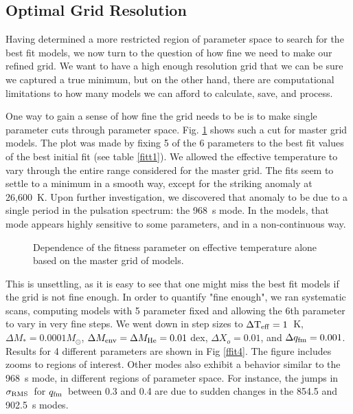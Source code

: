 \documentclass[12pt,preprint]{aastex}
\newcommand{\sigrms}{$\sigma_{\rm RMS}$}
\newcommand{\qfm}{$q_{\rm fm}$}
\begin{document}
\subsection{Optimal Grid Resolution}
\label{refinedfits}


Having determined a more restricted region of parameter space to search for 
the best fit models, we now turn to the question of how fine we need to 
make our refined grid. We want to have a high enough resolution grid that 
we can be sure we captured a true minimum, but on the other hand, there are 
computational limitations to how many models we can afford to calculate, 
save, and process.

One way to gain a sense of how fine the grid needs to be is to make single 
parameter cuts through parameter space. Fig.  \ref{ffit3} shows such a cut 
for master grid models. The plot was made by fixing 5 of the 6 parameters 
to the best fit values of the best initial fit (see table \ref{fitt1}).
We allowed the effective temperature to vary through the entire range 
considered for the master grid. The fits seem to settle to a minimum in a 
smooth way, except for the striking anomaly at 26,600~K. Upon further 
investigation, we discovered that anomaly to be due to a single period in 
the pulsation spectrum: the 968~s mode. In the models, that mode appears 
highly sensitive to some parameters, and in a non-continuous way.

\begin{figure}
\caption{
Dependence of the fitness parameter on effective temperature alone based on 
the master grid of models. \label{ffit3}
}
\end{figure}

This is unsettling, as it is easy to see that one might miss the best fit 
models if the grid is not fine enough. In order to quantify "fine enough", 
we ran systematic scans, computing models with 5 parameter fixed and allowing 
the 6th parameter to vary in very fine steps. We went down in 
step sizes to $\Delta {\rm T_{eff}}=1$~K, $\Delta M_*=0.0001 M_\odot$, 
$\Delta M_{\rm env}= \Delta M_{\rm He}=0.01$ dex, $\Delta X_o=0.01$, and $\Delta q_{\rm fm}=0.001$. 
Results for 4 different parameters are shown in Fig \ref{ffit4}. The figure 
includes zooms to regions of interest. Other modes also exhibit a behavior 
similar to the 968~s mode, in different regions of parameter space. For instance, 
the jumps in \sigrms\ for \qfm\ between 0.3 and 0.4 are due 
to sudden changes in the 854.5 and 902.5~s modes.
\end{document}
